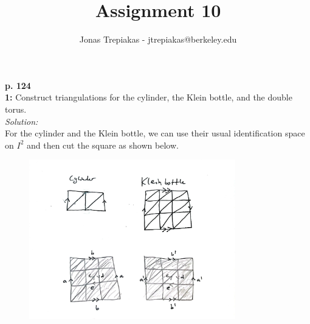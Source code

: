 \documentclass[a4paper]{article}
\title{Assignment 10}
\author{Jonas Trepiakas - jtrepiakas@berkeley.edu}
\date{}
\begin{document}
\maketitle
\newpage
    \textbf{p. 124}\\
    \textbf{1:} Construct triangulations for the cylinder, the Klein bottle,
    and the double torus.\\
    \linebreak
    \textit{Solution:}\\
    For the cylinder and the Klein bottle, we can use their usual
    identification space on $I^2$ and then cut the square as shown below.
    \begin{figure}[H]
        \centering
        \includegraphics[width=0.8\textwidth]{1.jpeg}
        \label{fig:1-jpeg}
    \end{figure}
\end{document}
